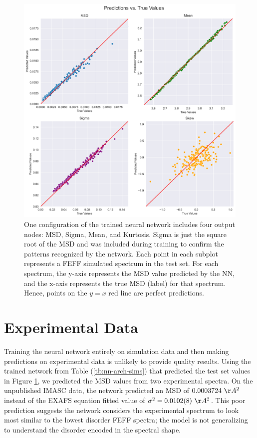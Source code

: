 \begin{figure}
    \centering
    \includegraphics[width=\linewidth]{Chapters/Figures/pa_train-test-fixed.png}
    \caption{One configuration of the trained neural network includes four output nodes: MSD, Sigma, Mean, and Kurtosis. Sigma is just the square root of the MSD and was included during training to confirm the patterns recognized by the network. Each point in each subplot represents a FEFF simulated spectrum in the test set. For each spectrum, the y-axis represents the MSD value predicted by the NN, and the x-axis represents the true MSD (label) for that spectrum. Hence, points on the $ y=x $ red line are perfect predictions.}
    \label{fig:train-test-split-all4}
\end{figure}

\section{Experimental Data} \label{ch:results}

Training the neural network entirely on simulation data and then making predictions on experimental data is unlikely to provide quality results. Using the trained network from Table (\ref{tb:nn-arch-sims}) that predicted the test set values in Figure \ref{fig:train-test-split-all4}, we predicted the MSD values from two experimental spectra. On the unpublished IMASC data, the network predicted an MSD of $0.0003724~\AA^2$ instead of the EXAFS equation fitted value of ${\sigma^2=0.0102(8)~\AA^2}$. This poor prediction suggests the network considers the experimental spectrum to look most similar to the lowest disorder FEFF spectra; the model is not generalizing to understand the disorder encoded in the spectral shape.


